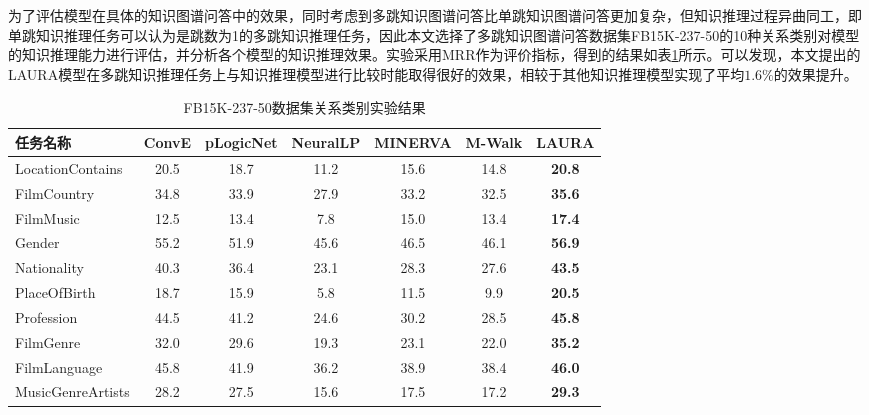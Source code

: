 \documentclass[algorithmlist, AutoFakeBold, AutoFakeSlant, figurelist, tablelist, nomlist, engineering]{seuthesix}
\begin{document}
为了评估模型在具体的知识图谱问答中的效果，同时考虑到多跳知识图谱问答比单跳知识图谱问答更加复杂，但知识推理过程异曲同工，即单跳知识推理任务可以认为是跳数为1的多跳知识推理任务，因此本文选择了多跳知识图谱问答数据集FB15K-237-50的10种关系类别对模型的知识推理能力进行评估，并分析各个模型的知识推理效果。实验采用MRR作为评价指标，得到的结果如表\ref{Experiment2_tasks}所示。可以发现，本文提出的LAURA模型在多跳知识推理任务上与知识推理模型进行比较时能取得很好的效果，相较于其他知识推理模型实现了平均$1.6\%$的效果提升。

\begin{table}[]
  \centering
  \begin{tabular*}{1\textwidth}{@{\extracolsep{\fill}}lcccccc}
  \toprule[1pt]
  任务名称 & ConvE & pLogicNet & NeuralLP & MINERVA & M-Walk & LAURA \\ \hline
  LocationContains & 20.5 & 18.7 & 11.2 & 15.6 & 14.8 & \textbf{20.8} \\
  FilmCountry & 34.8 & 33.9 & 27.9 & 33.2 & 32.5 & \textbf{35.6} \\
  FilmMusic & 12.5 & 13.4 & 7.8 & 15.0 & 13.4 & \textbf{17.4} \\
  Gender & 55.2 & 51.9 & 45.6 & 46.5 & 46.1 & \textbf{56.9} \\
  Nationality & 40.3 & 36.4 & 23.1 & 28.3 & 27.6 & \textbf{43.5} \\
  PlaceOfBirth & 18.7 & 15.9 & 5.8 & 11.5 & 9.9 & \textbf{20.5} \\
  Profession & 44.5 & 41.2 & 24.6 & 30.2 & 28.5 & \textbf{45.8} \\
  FilmGenre & 32.0 & 29.6 & 19.3 & 23.1 & 22.0 & \textbf{35.2} \\
  FilmLanguage & 45.8 & 41.9 & 36.2 & 38.9 & 38.4 & \textbf{46.0} \\
  MusicGenreArtists & 28.2 & 27.5 & 15.6 & 17.5 & 17.2 & \textbf{29.3} \\
  \bottomrule[1pt]
  \end{tabular*}
  \caption{FB15K-237-50数据集关系类别实验结果}
  \label{Experiment2_tasks}
\end{table}
\end{document}
